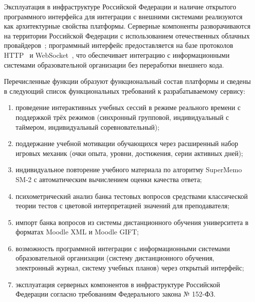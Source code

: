 Эксплуатация в инфраструктуре Российской Федерации
и наличие открытого программного интерфейса для интеграции
с внешними системами реализуются как архитектурные свойства
платформы. Серверные компоненты разворачиваются на территории
Российской Федерации с использованием отечественных облачных
провайдеров~\cite{fz152}; программный интерфейс предоставляется
на базе протоколов HTTP~\cite{rfc9110} и WebSocket~\cite{rfc6455},
что обеспечивает интеграцию с информационными системами
образовательной организации без переработки внешнего кода.

Перечисленные функции образуют функциональный состав платформы
и сведены в следующий список функциональных требований
к разрабатываемому сервису:
\begin{enumerate}
    \item проведение интерактивных учебных сессий в режиме реального
          времени с поддержкой трёх режимов (синхронный групповой,
          индивидуальный с таймером, индивидуальный соревновательный);
    \item поддержание учебной мотивации обучающихся через расширенный
          набор игровых механик (очки опыта, уровни, достижения,
          серии активных дней);
    \item индивидуальное повторение учебного материала по алгоритму
          SuperMemo SM-2 с автоматическим вычислением оценки качества
          ответа;
    \item психометрический анализ банка тестовых вопросов средствами
          классической теории тестов с цветовой интерпретацией значений
          для преподавателя;
    \item импорт банка вопросов из системы дистанционного обучения
          университета в форматах Moodle XML и Moodle GIFT;
    \item возможность программной интеграции с информационными
          системами образовательной организации (систему дистанционного
          обучения, электронный журнал, систему учебных планов)
          через открытый интерфейс;
    \item эксплуатация серверных компонентов в инфраструктуре
          Российской Федерации согласно требованиям Федерального
          закона № 152-ФЗ.
\end{enumerate}

